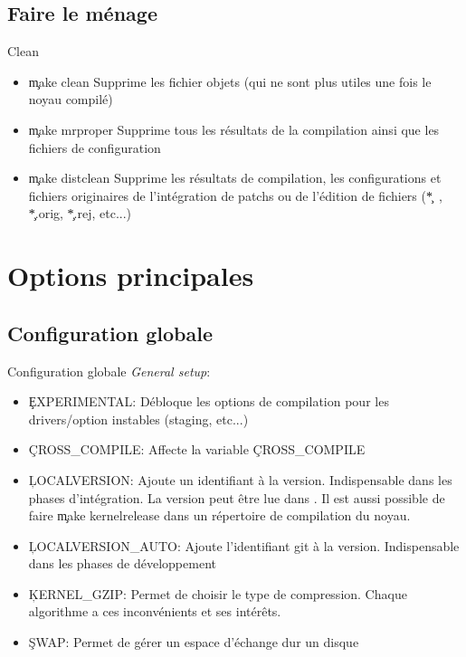\subsection{Faire le ménage}

\begin{frame}[fragile=singleslide]{Clean}
  \begin{itemize}
  \item \c{make clean}  Supprime les fichier objets (qui  ne sont plus
    utiles une fois le noyau compilé)
  \item \c{make mrproper} Supprime tous les résultats de la compilation
    ainsi que les fichiers de configuration
  \item \c{make distclean} Supprime  les résultats de compilation, les
    configurations et fichiers  originaires de l'intégration de patchs
    ou  de  l'édition  de  fichiers  (\c{*~},  \c{*.orig},  \c{*.rej},
    etc...)
  \end{itemize} 
\end{frame} 

\section{Options principales}

\subsection{Configuration globale}

\begin{frame}[fragile=singleslide]{Configuration globale}
  \emph{General setup}:
  \begin{itemize} 
  \item  \c{EXPERIMENTAL}: Débloque les  options de  compilation pour
    les drivers/option instables (staging, etc...)
  \item \c{CROSS_COMPILE}: Affecte la variable \c{CROSS_COMPILE}
  \item    \c{LOCALVERSION}:    Ajoute    un    identifiant    à    la
    version. Indispensable  dans les phases  d'intégration. La version
    peut être lue dans  . Il est aussi possible de
    faire \c{make kernelrelease} dans  un répertoire de compilation du
    noyau.
  \item   \c{LOCALVERSION_AUTO}:  Ajoute   l'identifiant   git  à   la
    version. Indispensable dans les phases de développement
  \item  \c{KERNEL_GZIP}: Permet  de choisir  le type  de compression.
    Chaque   algorithme   a  ces   inconvénients   et  ses   intérêts.
  \item \c{SWAP}: Permet de gérer un espace d'échange dur un disque
  \end{itemize}
\end{frame}

